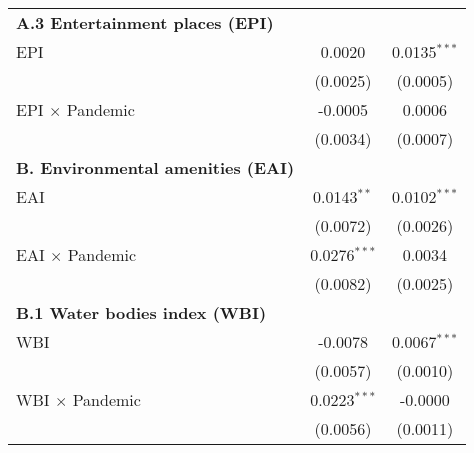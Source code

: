 {\begin{tabular}{lcc}
      \textbf{A.3 Entertainment places (EPI)}\\
      \hspace{0.5cm} EPI                                       & 0.0020          & 0.0135$^{***}$          \\
      \hspace{0.5cm}                                           & (0.0025)        & (0.0005)                \\
      \hspace{0.5cm} EPI $\times$ Pandemic                     & -0.0005         & 0.0006                  \\
      \hspace{0.5cm}                                           & (0.0034)        & (0.0007)                \\

      \textbf{B. Environmental amenities (EAI)}\\
      \hspace{0.5cm} EAI                                       & 0.0143$^{**}$   & 0.0102$^{***}$          \\
      \hspace{0.5cm}                                           & (0.0072)        & (0.0026)                \\
      \hspace{0.5cm} EAI $\times$ Pandemic                     & 0.0276$^{***}$  & 0.0034                  \\
      \hspace{0.5cm}                                           & (0.0082)        & (0.0025)                \\

      \textbf{B.1 Water bodies index (WBI)}\\
      \hspace{0.5cm} WBI                                       & -0.0078         & 0.0067$^{***}$           \\
      \hspace{0.5cm}                                           & (0.0057)        & (0.0010)                 \\
      \hspace{0.5cm} WBI $\times$ Pandemic                     & 0.0223$^{***}$  & -0.0000                   \\
      \hspace{0.5cm}                                           & (0.0056)        & (0.0011)                 \\


\end{tabular}}

